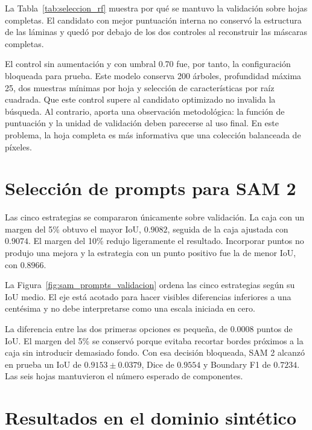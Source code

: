 La Tabla~\ref{tab:seleccion_rf} muestra por qué se mantuvo la validación sobre hojas completas. El candidato con mejor puntuación interna no conservó la estructura de las láminas y quedó por debajo de los dos controles al reconstruir las máscaras completas.

El control sin aumentación y con umbral 0.70 fue, por tanto, la configuración bloqueada para prueba. Este modelo conserva 200 árboles, profundidad máxima 25, dos muestras mínimas por hoja y selección de características por raíz cuadrada. Que este control supere al candidato optimizado no invalida la búsqueda. Al contrario, aporta una observación metodológica: la función de puntuación y la unidad de validación deben parecerse al uso final. En este problema, la hoja completa es más informativa que una colección balanceada de píxeles.

\section{Selección de prompts para SAM 2}

Las cinco estrategias se compararon únicamente sobre validación. La caja con un margen del 5\% obtuvo el mayor IoU, $0.9082$, seguida de la caja ajustada con $0.9074$. El margen del 10\% redujo ligeramente el resultado. Incorporar puntos no produjo una mejora y la estrategia con un punto positivo fue la de menor IoU, con $0.8966$.

La Figura~\ref{fig:sam_prompts_validacion} ordena las cinco estrategias según su IoU medio. El eje está acotado para hacer visibles diferencias inferiores a una centésima y no debe interpretarse como una escala iniciada en cero.


La diferencia entre las dos primeras opciones es pequeña, de $0.0008$ puntos de IoU. El margen del 5\% se conservó porque evitaba recortar bordes próximos a la caja sin introducir demasiado fondo. Con esa decisión bloqueada, SAM 2 alcanzó en prueba un IoU de $0.9153 \pm 0.0379$, Dice de $0.9554$ y Boundary F1 de $0.7234$. Las seis hojas mantuvieron el número esperado de componentes.

\section{Resultados en el dominio sintético}

